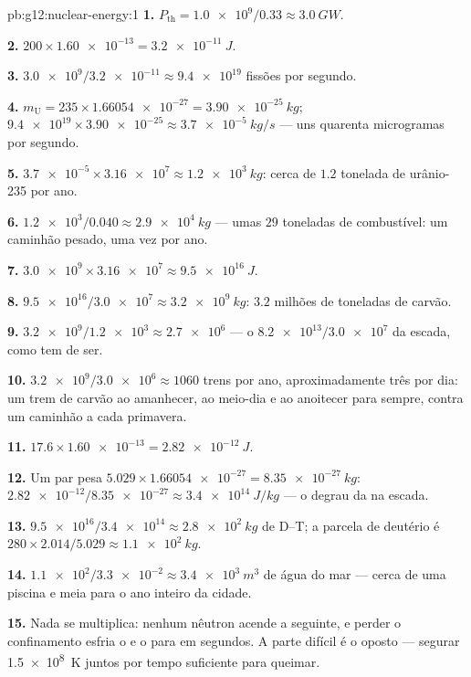 \begin{solution}{pb:g12:nuclear-energy:1}
\textbf{1.} $P_{\text{th}} = \num{1.0e9}/0.33 \approx \qty{3.0}{GW}$.

\textbf{2.} $200 \times \num{1.60e-13} = \qty{3.2e-11}{J}$.

\textbf{3.} $\num{3.0e9}/\num{3.2e-11} \approx \num{9.4e19}$ fissões por
segundo.

\textbf{4.} $m_{\mathrm U} = 235 \times \num{1.66054e-27} =
\qty{3.90e-25}{kg}$;
$\num{9.4e19} \times \num{3.90e-25} \approx \qty{3.7e-5}{kg/s}$ --- uns
quarenta microgramas por segundo.

\textbf{5.} $\num{3.7e-5} \times \num{3.16e7} \approx \qty{1.2e3}{kg}$:
cerca de $1.2$ tonelada de urânio-235 por ano.

\textbf{6.} $\num{1.2e3}/0.040 \approx \qty{2.9e4}{kg}$ --- umas $29$
toneladas de combustível: um caminhão pesado, uma vez por ano.

\textbf{7.} $\num{3.0e9} \times \num{3.16e7} \approx \qty{9.5e16}{J}$.

\textbf{8.} $\num{9.5e16}/\num{3.0e7} \approx \qty{3.2e9}{kg}$: $3.2$
milhões de toneladas de carvão.

\textbf{9.} $\num{3.2e9}/\num{1.2e3} \approx \num{2.7e6}$ --- o
$\num{8.2e13}/\num{3.0e7}$ da escada, como tem de ser.

\textbf{10.} $\num{3.2e9}/\num{3.0e6} \approx 1060$ trens por ano,
aproximadamente três por dia: um trem de carvão ao amanhecer, ao meio-dia
e ao anoitecer para sempre, contra um caminhão a cada primavera.

\textbf{11.} $17.6 \times \num{1.60e-13} = \qty{2.82e-12}{J}$.

\textbf{12.} Um par pesa $5.029 \times \num{1.66054e-27} =
\qty{8.35e-27}{kg}$:
$\num{2.82e-12}/\num{8.35e-27} \approx \qty{3.4e14}{J/kg}$ --- o degrau
da  na escada.

\textbf{13.} $\num{9.5e16}/\num{3.4e14} \approx \qty{2.8e2}{kg}$ de
D--T; a parcela de deutério é
$280 \times 2.014/5.029 \approx \qty{1.1e2}{kg}$.

\textbf{14.} $\num{1.1e2}/\num{3.3e-2} \approx \qty{3.4e3}{m^3}$ de água
do mar --- cerca de uma piscina e meia para o ano inteiro da cidade.

\textbf{15.} Nada se multiplica: nenhum nêutron acende a  seguinte,
e perder o confinamento esfria o  e o para em segundos. A parte
difícil é o oposto --- segurar \qty{1.5e8}{K} juntos por tempo suficiente
para queimar.


\end{solution}
